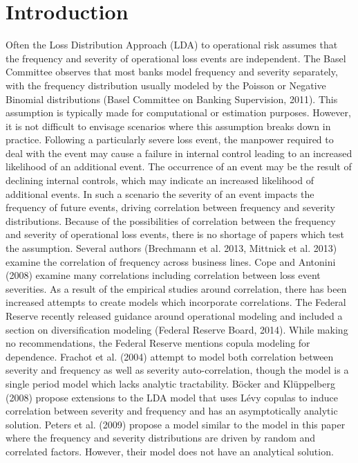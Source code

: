 \documentclass{article}
\theoremstyle{definition}
\begin{document}
\newpage
\section{Introduction}

Often the Loss Distribution Approach (LDA) to operational risk assumes that the frequency and severity of operational loss events are independent.  The Basel Committee observes that most banks model frequency and severity separately, with the frequency distribution usually modeled by the Poisson or Negative Binomial distributions (Basel Committee on Banking Supervision, 2011).  This assumption is typically made for computational or estimation purposes.  However, it is not difficult to envisage scenarios where this assumption breaks down in practice.  Following a particularly severe loss event, the manpower required to deal with the event may cause a failure in internal control leading to an increased likelihood of an additional event.  The occurrence of an event may be the result of declining internal controls, which may indicate an increased likelihood of additional events.  In such a scenario the severity of an event impacts the frequency of future events, driving correlation between frequency and severity distributions.  Because of the possibilities of correlation between the frequency and severity of operational loss events, there is no shortage of papers which test the assumption. Several authors (Brechmann et al. 2013, Mittnick et al. 2013) examine the correlation of frequency across business lines.  Cope and Antonini (2008) examine many correlations including correlation between loss event severities.  As a result of the empirical studies around correlation, there has been increased attempts to create models which incorporate correlations.  The Federal Reserve recently released guidance around operational modeling and included a section on diversification modeling (Federal Reserve Board, 2014).  While making no recommendations, the Federal Reserve mentions copula modeling for dependence.  Frachot et al. (2004) attempt to model both correlation between severity and frequency as well as severity auto-correlation, though the model is a single period model which lacks analytic tractability.   B\"ocker and Kl\"uppelberg (2008) propose extensions to the LDA model that uses L\'evy copulas to induce correlation between severity and frequency and has an asymptotically analytic solution.  Peters et al. (2009) propose a model similar to the model in this paper where the frequency and severity distributions are driven by random and correlated factors.  However, their model does not have an analytical solution.
\end{document}

